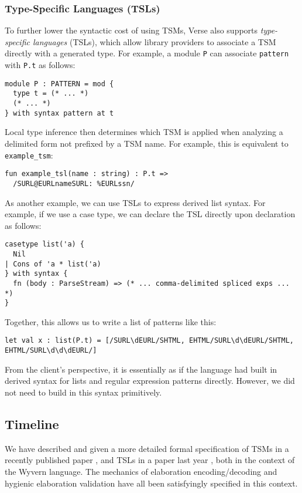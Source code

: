 \subsubsection{Type-Specific Languages (TSLs)}\label{sec:tsls}
To further lower the syntactic cost of using TSMs, Verse also  supports \emph{type-specific languages} (TSLs), which allow library providers to associate a TSM directly with a generated type. For example, a module \lstinline{P} can associate \lstinline{pattern} with \lstinline{P.t} as follows:
\begin{lstlisting}[numbers=none]
module P : PATTERN = mod {
  type t = (* ... *)
  (* ... *)
} with syntax pattern at t
\end{lstlisting}

 Local type inference then determines which TSM is applied when analyzing a delimited form not prefixed by a TSM name. For example, this is equivalent to \lstinline{example_tsm}:
\begin{lstlisting}[numbers=none]
fun example_tsl(name : string) : P.t => 
  /SURL@EURLnameSURL: %EURLssn/
\end{lstlisting}

As another example, we can use TSLs to express derived list syntax. For example, if we use a case type, we can declare the TSL directly upon declaration as follows:
\begin{lstlisting}[numbers=none]
casetype list('a) {
  Nil
| Cons of 'a * list('a)
} with syntax {
  fn (body : ParseStream) => (* ... comma-delimited spliced exps ... *)
}
\end{lstlisting}
Together, this allows us to write a list of patterns like this:
\begin{lstlisting}[numbers=none]
let val x : list(P.t) = [/SURL\dEURL/SHTML, EHTML/SURL\d\dEURL/SHTML, EHTML/SURL\d\d\dEURL/]
\end{lstlisting}
From the client's perspective, it is essentially as if the language had built in derived syntax for lists and regular expression patterns directly. However, we did not need to build in this syntax primitively.%
\subsection{Timeline}\label{sec:syntax-timeline}
We have described and given a more detailed formal specification of TSMs in a recently published paper \cite{sac15}, and TSLs in a paper last year \cite{TSLs}, both in the context of the Wyvern language. The mechanics of elaboration encoding/decoding and hygienic elaboration validation have all been satisfyingly specified in this context. 

